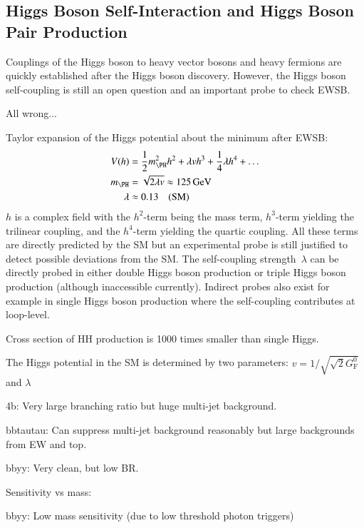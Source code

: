 \subsection{Higgs Boson Self-Interaction and Higgs Boson Pair Production}

Couplings of the Higgs boson to heavy vector bosons and heavy fermions
are quickly established after the Higgs boson discovery. However, the
Higgs boson self-coupling is still an open question and an important
probe to check EWSB.


All wrong...

Taylor expansion of the Higgs potential about the minimum after EWSB:
\begin{align*}
  V(h) &= \frac{1}{2} m_{\PH}^2 h^2 + \lambda v h^3 + \frac{1}{4} \lambda h^4 + \dots \\
  m_{\PH} &= \sqrt{2 \lambda v} \approx \SI{125}{\GeV} \\
  \lambda &\approx 0.13 \quad \text{(SM)}
\end{align*}
$h$ is a complex field with the $h^2$-term being the mass term,
$h^3$-term yielding the trilinear coupling, and the $h^4$-term
yielding the quartic coupling. All these terms are directly predicted
by the SM but an experimental probe is still justified to detect
possible deviations from the SM. The self-coupling strength~$\lambda$
can be directly probed in either double Higgs boson production or
triple Higgs boson production (although inaccessible
currently). Indirect probes also exist for example in single Higgs
boson production where the self-coupling contributes at loop-level.

Cross section of HH production is 1000 times smaller than single
Higgs. 

The Higgs potential in the SM is determined by two parameters:
$v = 1 / \sqrt{\sqrt{2} G_{\text{F}}^0}$ and $\lambda$



4b: Very large branching ratio but huge multi-jet background.

bbtautau: Can suppress multi-jet background reasonably but large
backgrounds from EW and top.

bbyy: Very clean, but low BR.

Sensitivity vs mass:

bbyy: Low mass sensitivity (due to low threshold photon triggers)

